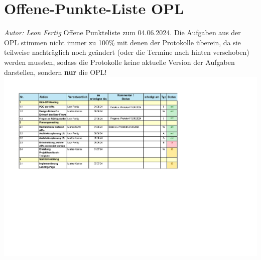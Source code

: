\documentclass[12pt]{article}
\begin{document}
\section{Offene-Punkte-Liste OPL}
{\it Autor: Leon Fertig}
\newline
Offene Punkteliste zum 04.06.2024.
Die Aufgaben aus der OPL stimmen nicht immer zu 100\% mit denen der Protokolle überein, da sie teilweise nachträglich noch geändert (oder die Termine nach hinten verschoben) werden mussten, sodass die Protokolle keine aktuelle Version der Aufgaben darstellen, sondern {\bf nur} die OPL!
\newline
\includegraphics[width=\textwidth]{Planungsdokumente/graphics/Offene_Punkteliste.pdf}
\end{document}
